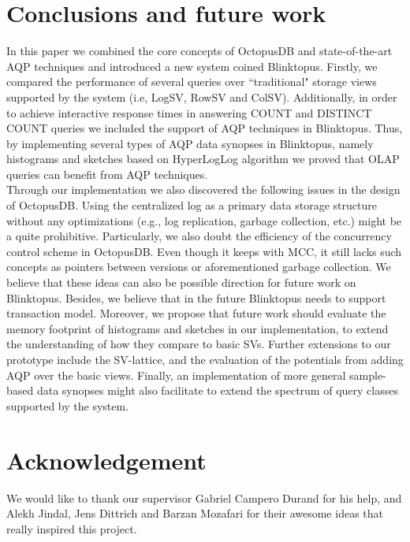 \documentclass[10pt, conference, compsocconf]{IEEEtran}
\begin{document}
\section{Conclusions and future work}
In this paper we combined the core concepts of OctopusDB and state-of-the-art AQP techniques and introduced a new system coined Blinktopus. Firstly, we compared the performance of several queries over ``traditional" storage views supported by the system (i.e, LogSV, RowSV and ColSV). Additionally, in order to achieve interactive response times in answering COUNT and DISTINCT COUNT queries we included the support of AQP techniques in Blinktopus. Thus, by implementing several types of AQP data synopses in Blinktopus, namely histograms and sketches based on HyperLogLog algorithm we proved that OLAP queries can benefit from AQP techniques. \\
Through our implementation we also discovered the following issues in the design of OctopusDB. Using the centralized log as a primary data storage structure without any optimizations (e.g., log replication, garbage collection, etc.) might be a quite prohibitive. Particularly, we also doubt the efficiency of the concurrency control scheme in OctopusDB. Even though it keeps with MCC, it still lacks such concepts as pointers between versions or aforementioned garbage collection. We believe that these ideas can also be possible direction for future work on Blinktopus. Besides, we believe that in the future Blinktopus needs to support transaction model. Moreover, we propose that future work should evaluate the memory footprint of histograms and sketches in our implementation, to extend the understanding of how they compare to basic SVs. Further extensions to our prototype include the SV-lattice, and the evaluation of the potentials from adding AQP over the basic views. Finally, an implementation of more general sample-based data synopses might also facilitate to extend the spectrum of query classes supported by the system.

\section*{Acknowledgement}
We would like to thank our supervisor Gabriel Campero Durand for his help, and Alekh Jindal, Jens Dittrich and Barzan Mozafari for their awesome ideas that really inspired this project.
\end{document}
